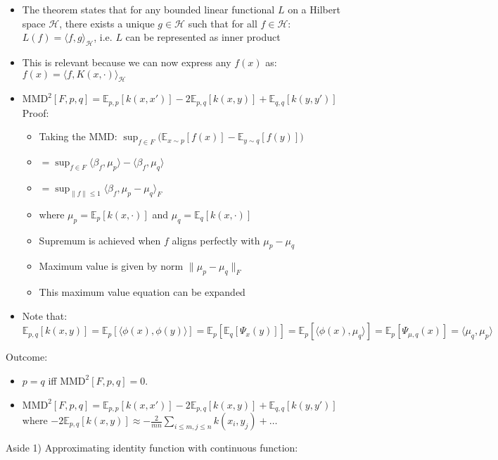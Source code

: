 \begin{itemize}
    \item The theorem states that for any bounded linear functional $L$ on a Hilbert space $\mathcal{H}$, there exists a unique $g \in \mathcal{H}$ such that for all $f \in \mathcal{H}$:
    $L(f) = \langle f, g \rangle_{\mathcal{H}}$, i.e. $L$ can be represented as inner product
    \item This is relevant because we can now express any $f(x)$ as:$f(x) = \langle f, K(x, \cdot) \rangle_{\mathcal{H}}$
    \item $\text{MMD}^2[F, p, q] = \mathbb{E}_{p, p}[k(x, x')] - 2 \mathbb{E}_{p, q}[k(x, y)] + \mathbb{E}_{q, q}[k(y, y')]$\\
    Proof:
    \begin{itemize}
        \item Taking the MMD: $\sup_{f \in F} \Big( \mathbb{E}_{x \sim p}[f(x)] - \mathbb{E}_{y \sim q}[f(y)] \Big)$
        \item $= \sup_{f \in F} \langle \beta_f, \mu_p\rangle - \langle \beta_f, \mu_q \rangle$
        \item $= \sup_{\|f\|  \leq 1} \langle \beta_f, \mu_p - \mu_q \rangle_F$ \item where $\mu_p = \mathbb{E}_p[k(x, \cdot)]$ and $\mu_q = \mathbb{E}_q[k(x, \cdot)]$
        \item Supremum is achieved when $f$ aligns perfectly with $\mu_p - \mu_q$
        \item Maximum value is given by norm $\|\mu_p - \mu_q\|_F$
        \item This maximum value equation can be expanded
    \end{itemize}
    \item Note that: $\mathbb{E}_{p, q}[k(x, y)] = \mathbb{E}_p[\langle \phi(x), \phi(y) \rangle] = \mathbb{E}_p[\mathbb{E}_q[\Psi_x(y)]] = \mathbb{E}_p[\langle \phi(x), \mu_q \rangle] = \mathbb{E}_p[\Psi_{\mu,q}(x)] = \langle \mu_q, \mu_p \rangle$
\end{itemize}
Outcome:
\begin{itemize}
    \item $p = q$ iff $\text{MMD}^2[F, p, q] = 0$.
    \item $\text{MMD}^2[F, p, q] = \mathbb{E}_{p, p}[k(x, x')] - 2 \mathbb{E}_{p, q}[k(x, y)] + \mathbb{E}_{q, q}[k(y, y')]$ where $-2 \mathbb{E}_{p, q}[k(x, y)] \approx -\frac{2}{mn} \sum_{i \leq m, j \leq n} k(x_i, y_j) + \ldots$
\end{itemize}
Aside 1) Approximating identity function with continuous function:
